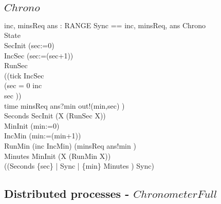 \subsection{$Chrono$}
\begin{circus}
\circchannel inc, minsReq
\also \circchannel ans : RANGE
\also \circchannelset Sync == \lchanset inc, minsReq, ans \rchanset
\also \circprocess Chrono \circdef\ \circbegin\\
\circstate State \\
 SecInit \circdef (sec:=0)\\
 IncSec \circdef (sec:=(sec+1))\\
 RunSec \circdef\\
((tick \then IncSec \circseq\\
    (\circif  sec = 0 \circthen inc \then \Skip\\
    \circelse sec  \circthen \Skip \circfi))\\
  \extchoice time \then minsReq \then ans?min \then out!(min,sec)
      \then \Skip )  \\
 Seconds \circdef SecInit \circseq (\circmu X \circspot (RunSec \circseq X))\\
 MinInit \circdef (min:=0)\\
 IncMin \circdef (min:=(min+1))\\
 RunMin \circdef (inc \then IncMin) \extchoice (minsReq \then ans!min \then \Skip)\\
 Minutes \circdef MinInit \circseq (\circmu X \circspot (RunMin \circseq X))\\
\circspot ((Seconds \lpar \{sec\} | Sync | \{min\} \rpar Minutes ) \circhide Sync)\\
\circend
\end{circus}
\subsection{Distributed processes - $ChronometerFull$}
